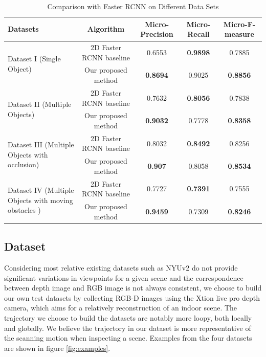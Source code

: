 \documentclass[conference]{IEEEtran}
\begin{document}
\begin{table}[htbp]
	\centering
	\normalsize
	\caption{{\color{blue}Comparison with Faster RCNN on Different Data Sets}}
	\label{t1}
	\begin{tabular}{lcccc}
		\hline
		Datasets & Algorithm & {\color{blue}Micro-Precision} &{\color{blue}Micro-Recall} &{\color{blue} Micro-F-measure}\\
		\hline
		\multirow {2}{5cm}{ Dataset I (Single Object)}&2D Faster RCNN baseline&0.6553&\textbf{0.9898}&0.7885\\	
		&Our proposed method&\textbf{0.8694}&0.9025&\textbf{0.8856}\\
		\cline{1-5}
		\multirow {2}{5cm}{ Dataset II (Multiple Objects)}&2D Faster RCNN baseline&0.7632&\textbf{0.8056}&0.7838\\
		&Our proposed method&\textbf{0.9032}&0.7778&\textbf{0.8358}\\	
		\cline{1-5}
		\multirow {2}{5cm}{ Dataset III (Multiple Objects with occlusion)}&2D Faster RCNN baseline&0.8032&\textbf{0.8492}&0.8256\\	
		&Our proposed method&\textbf{0.907}&0.8058&\textbf{0.8534}\\	
		\cline{1-5}
		\multirow {2}{5cm}{ Dataset IV (Multiple Objects with moving obstacles )}&2D Faster RCNN baseline&0.7727&\textbf{0.7391}&0.7555\\	
		&Our proposed method&\textbf{0.9459}&0.7309&\textbf{0.8246}\\
		\hline
	\end{tabular}
\end{table}

\subsection{\textbf{Dataset}}

Considering most relative existing datasets such as  NYUv2 \cite{Silberman2012}  {\color{blue}do not} provide significant variations in viewpoints for a given scene and the correspondence between depth image and RGB image is not always consistent, we choose to build our own test datasets by collecting RGB-D images using the Xtion live pro depth camera, which aims for a relatively reconstruction of an indoor scene. The trajectory we choose to build the datasets are notably more loopy, both locally and globally. We believe the trajectory in our dataset is more representative of the scanning motion when inspecting a scene. Examples from the four datasets are shown in figure \ref{fig:examples}.
\end{document}
